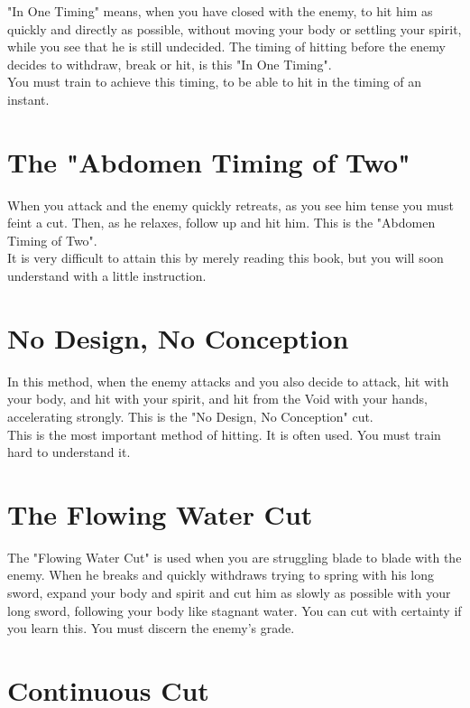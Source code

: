 "In One Timing" means, when you have closed with the enemy, to hit him as quickly and directly as possible, without moving your body or settling your spirit, while you see that he is still undecided. The timing of hitting before the enemy decides to withdraw, break or hit, is this "In One Timing".\\

You must train to achieve this timing, to be able to hit in the timing of an instant.\\
\section{The "Abdomen Timing of Two"}

When you attack and the enemy quickly retreats, as you see him tense you must feint a cut. Then, as he relaxes, follow up and hit him. This is the "Abdomen Timing of Two".\\

It is very difficult to attain this by merely reading this book, but you will soon understand with a little instruction.\\
\section{No Design, No Conception}

In this method, when the enemy attacks and you also decide to attack, hit with your body, and hit with your spirit, and hit from the Void with your hands, accelerating strongly. This is the "No Design, No Conception" cut.\\

This is the most important method of hitting. It is often used. You must train hard to understand it.\\
\section{The Flowing Water Cut}

The "Flowing Water Cut" is used when you are struggling blade to blade with the enemy. When he breaks and quickly withdraws trying to spring with his long sword, expand your body and spirit and cut him as slowly as possible with your long sword, following your body like stagnant water. You can cut with certainty if you learn this. You must discern the enemy's grade.\\
\section{Continuous Cut}

